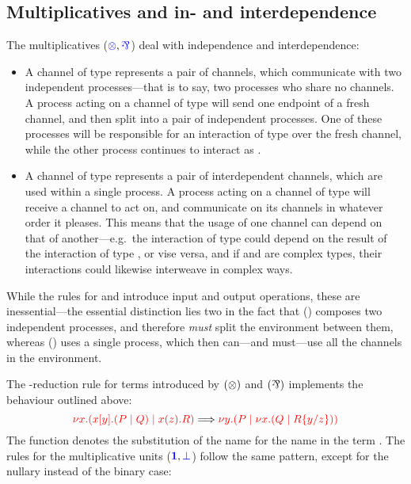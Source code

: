 \subsection{Multiplicatives and in- and interdependence}
\label{sec:cp-multiplicatives}
The multiplicatives ($\ty{\tens}, \ty{\parr}$) deal with independence and
interdependence:
\begin{itemize}
\item
  A channel of type  represents a pair of channels, which
  communicate with two independent processes---that is to say, two
  processes who share no channels.
  A process acting on a channel of type  will send one endpoint of
  a fresh channel, and then split into a pair of independent processes.
  One of these processes will be responsible for an interaction of type 
  over the fresh channel, while the other process continues to interact as
  .
\item
  A channel of type  represents a pair of interdependent channels,
  which are used within a single process.
  A process acting on a channel of type  will receive a channel to
  act on, and communicate on its channels in whatever order it pleases.
  This means that the usage of one channel can depend on that of
  another---e.g.\ the interaction of type  could depend on the result of
  the interaction of type , or vise versa, and if  and  are
  complex types, their interactions could likewise interweave in complex ways.
\end{itemize}
While the rules for \ty{\tens} and \ty{\parr} introduce input and output
operations, these are inessential---the essential distinction lies two in the
fact that (\tens) composes two independent processes, and therefore \emph{must}
split the environment between them, whereas (\parr) uses a single process, which
then can---and must---use all the channels in the environment.
\begin{center}
  \cpInfTens
  \cpInfParr
\end{center}
The \textbeta-reduction rule for terms introduced by $(\tens)$ and $(\parr)$
implements the behaviour outlined above:
\[
  \tm{\cpCut{x}{\cpSend{x}{y}{P}{Q}}{\cpRecv{x}{z}{R}}}
  \Longrightarrow
  \tm{\cpCut{y}{P}{\cpCut{x}{Q}{\cpSub{y}{z}{R}}}}
\]
The function  denotes the substitution of the name 
for the name  in the term .
%
The rules for the multiplicative units ($\ty{\one}, \ty{\bot}$) follow the same
pattern, except for the nullary instead of the binary case:
